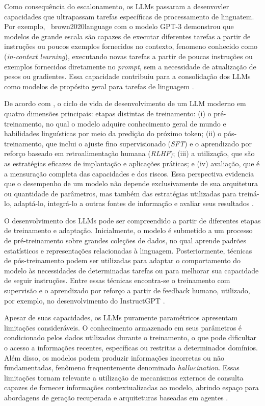 Como consequência do escalonamento, os LLMs passaram a desenvovler capacidades que ultrapassam tarefas específicas de processamento de linguatem. Por exemplo, \ {brown2020language} com o modelo GPT-3 demonstrou que modelos de grande escala são capazes de executar diferentes tarefas a partir de instruções ou poucos exemplos fornecidos no contexto, fenomeno conhecido como (\textit{in-context learning}), executando novas tarefas a partir de poucas instruções ou exemplos fornecidos diretamente no \textit{prompt}, sem a necessidade de atualização de pesos ou gradientes. Essa capacidade contribuiu para a consolidação dos LLMs como modelos de propósito geral para tarefas de linguagem \cite{brown2020language}.

De acordo com , o ciclo de vida de desenvolvimento de um LLM moderno em quatro dimensões principais: etapas distintas de treinamento: (i) o pré-treinamento, no qual o modelo adquire conhecimento geral de mundo e habilidades linguísticas por meio da predição do próximo token; (ii) o pós-treinamento, que inclui o ajuste fino supervisionado (\textit{SFT}) e o aprendizado por reforço baseado em retroalimentação humana (\textit{RLHF}); (iii) a utilização, que são as estratégias eficazes de implantação e aplicações práticas; e (iv) avaliação, que é a mensuração completa das capacidades e dos riscos. Essa perspectiva evidencia que o desempenho de um modelo não depende exclusivamente de sua arquitetura ou quantidade de parâmetros, mas também das estratégias utilizadas para treiná-lo, adaptá-lo, integrá-lo a outras fontes de informação e avaliar seus resultados \cite{zhao2026survey}.

O desenvolvimento dos LLMs pode ser compreendido a partir de diferentes etapas de treinamento e adaptação. Inicialmente, o modelo é submetido a um processo de pré-treinamento sobre grandes coleções de dados, no qual aprende padrões estatísticos e representações relacionadas à linguagem. Posteriormente, técnicas de pós-treinamento podem ser utilizadas para adaptar o comportamento do modelo às necessidades de determinadas tarefas ou para melhorar sua capacidade de seguir instruções. Entre essas técnicas encontra-se o treinamento com supervisão e o aprendizado por reforço a partir de feedback humano, utilizado, por exemplo, no desenvolvimento do InstructGPT \cite{ouyang2022training}.

Apesar de suas capacidades, os LLMs puramente paramétricos apresentam limitações consideráveis. O conhecimento armazenado em seus parâmetros é condicionado pelos dados utilizados durante o treinamento, o que pode dificultar o acesso a informações recentes, específicas ou restritas a determinados domínios. Além disso, os modelos podem produzir informações incorretas ou não fundamentadas, fenômeno frequentemente denominado \textit{hallucination}. Essas limitações tornam relevante a utilização de mecanismos externos de consulta capazes de fornecer informações contextualizadas ao modelo, abrindo espaço para abordagens de geração recuperada e arquiteturas baseadas em agentes \cite{zhao2026survey}.

